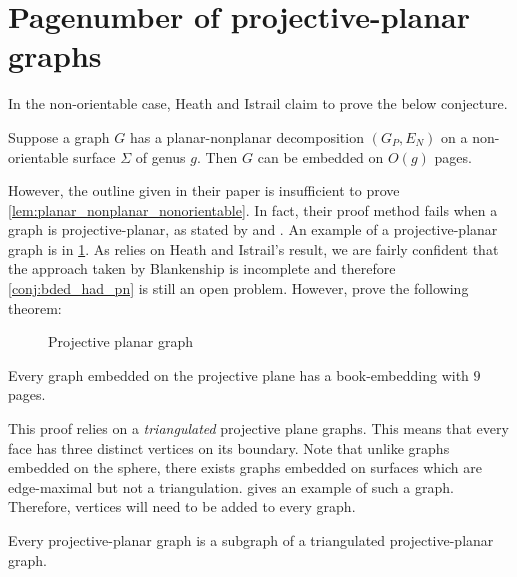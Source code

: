 
\section{Pagenumber of projective-planar graphs}
In the non-orientable case, Heath and Istrail claim to prove the below conjecture.
\begin{conjecture}\label{lem:planar_nonplanar_nonorientable}
	Suppose a graph \(G\) has a planar-nonplanar decomposition \((G_P, E_N)\) on a non-orientable surface \(\Sigma\) of genus $g$. Then \(G\) can be embedded on \( O(g)\) pages.
\end{conjecture}
However, the outline given in their paper is insufficient to prove \cref*{lem:planar_nonplanar_nonorientable}. In fact, their proof method fails when a graph is projective-planar, as stated by \textcite{nakamotoBookEmbeddingProjectiveplanar2015} and \textcite{ozekiBookEmbeddingGraphs2019}. An example of a projective-planar graph is in \cref{fig:projectiveplanar}. As \textcite{Blankenship-PhD03} relies on Heath and Istrail's result, we are fairly confident that the approach taken by Blankenship is incomplete and therefore \cref{conj:bded_had_pn} is still an open problem. However, \textcite{nakamotoBookEmbeddingProjectiveplanar2015} prove the following theorem:

\begin{figure}[h]
    \centering
    
    \caption{Projective planar graph}\label{fig:projectiveplanar}
\end{figure}

\begin{theorem}\label{thm:proj_planar_graphs_9pages}
	Every graph embedded on the projective plane has a book-embedding with $9$ pages.
\end{theorem}

This proof relies on a \textit{triangulated} projective plane graphs. This means that every face has three distinct vertices on its boundary. Note that unlike graphs embedded on the sphere, there exists graphs embedded on surfaces which are edge-maximal but not a triangulation. \textcite{hararyMaximalToroidalGraph1973} gives an example of such a graph. Therefore, vertices will need to be added to every graph. 

\begin{theorem}
    Every projective-planar graph is a subgraph of a triangulated projective-planar graph.
\end{theorem}

